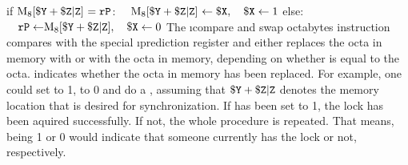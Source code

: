 \instrtblfour
	{}
	{if $\vmem{8}{\dr{Y} + \udrim{Z}}~= \sr{P}$:}
	{$\quad \vmem{8}{\dr{Y} + \udrim{Z}}~\leftarrow \dr{X},\quad \dr{X} \leftarrow 1$}
	{else:}
	{$\quad \sr{P} \leftarrow \vmem{8}{\dr{Y} + \udrim{Z}},\quad \dr{X} \leftarrow 0$}
\noindent The \i{compare and swap octabytes} instruction compares  with the special \i{prediction register}  and either replaces the octa in memory with  or  with the octa in memory, depending on whether  is equal to the octa.  indicates whether the octa in memory has been replaced. \citep[pg. 25]{mmix-doc} For example, one could set  to 1,  to 0 and do a , assuming that ${\tt \$Y} + {\tt \$Z}{\tt|Z}$ denotes the memory location that is desired for synchronization. If  has been set to 1, the lock has been aquired successfully. If not, the whole procedure is repeated. That means,  being 1 or 0 would indicate that someone currently has the lock or not, respectively.

